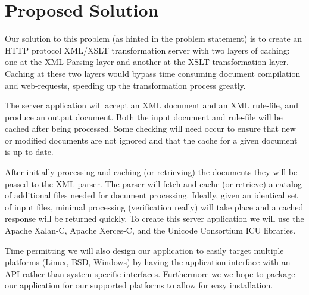 % 
% 
\section*{Proposed Solution}

Our solution to this problem (as hinted in the problem statement) is to create an HTTP protocol XML/XSLT transformation server with two layers of caching: one at the XML Parsing layer and another at the XSLT transformation layer.
Caching at these two layers would bypass time consuming document compilation and web-requests, speeding up the transformation process greatly.

The server application will accept an XML document and an XML rule-file, and produce an output document.
Both the input document and rule-file will be cached after being processed.
Some checking will need occur to ensure that new or modified documents are not ignored and that the cache for a given document is up to date.

After initially processing and caching (or retrieving) the documents they will be passed to the XML parser.
The parser will fetch and cache (or retrieve) a catalog of additional files needed for document processing.
Ideally, given an identical set of input files, minimal processing (verification really) will take place and a cached response will be returned quickly.
To create this server application we will use the Apache Xalan-C, Apache Xerces-C, and the Unicode Consortium ICU libraries. \cite{xalan,xerces,icu}

Time permitting we will also design our application to easily target multiple platforms (Linux, BSD, Windows) by having the application interface with an API rather than system-specific interfaces.
Furthermore we we hope to package our application for our supported platforms to allow for easy installation.

